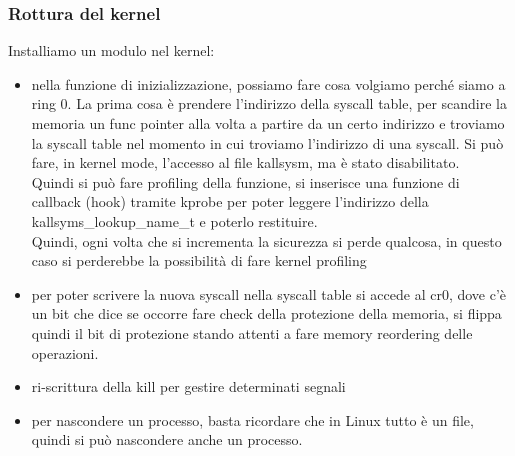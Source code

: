 \documentclass[12pt, oneside]{extbook} %
\begin{document}
\subsubsection{Rottura del kernel}
Installiamo un modulo nel kernel:
\begin{itemize}
\item nella funzione di inizializzazione, possiamo fare cosa volgiamo perché siamo a ring 0. La prima cosa è prendere l'indirizzo della syscall table, per scandire la memoria un func pointer alla volta a partire da un certo indirizzo e troviamo la syscall table nel momento in cui troviamo l'indirizzo di una syscall. Si può fare, in kernel mode, l'accesso al file kallsysm, ma è stato disabilitato.\\Quindi si può fare profiling della funzione, si inserisce una funzione di callback (hook) tramite kprobe per poter leggere l'indirizzo della kallsyms\_lookup\_name\_t e poterlo restituire.\\ Quindi, ogni volta che si incrementa la sicurezza si perde qualcosa, in questo caso si perderebbe la possibilità di fare kernel profiling
\item per poter scrivere la nuova syscall nella syscall table si accede al cr0, dove c'è un bit che dice se occorre fare check della protezione della memoria, si flippa quindi il bit di protezione stando attenti a fare memory reordering delle operazioni.
\item ri-scrittura della kill per gestire determinati segnali
\item per nascondere un processo, basta ricordare che in Linux tutto è un file, quindi si può nascondere anche un processo.
\end{itemize}
\end{document}
